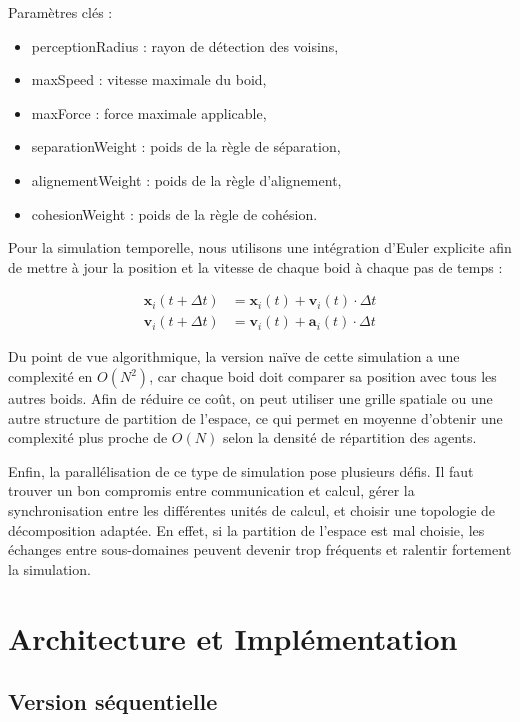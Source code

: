 \documentclass[conference]{IEEEtran}
\begin{document}
Paramètres clés :

\begin{itemize}
	\item perceptionRadius : rayon de détection des voisins,
	\item maxSpeed : vitesse maximale du boid,
	\item maxForce : force maximale applicable,
	\item separationWeight : poids de la règle de séparation,
	\item alignementWeight : poids de la règle d’alignement,
	\item cohesionWeight : poids de la règle de cohésion.
\end{itemize}

Pour la simulation temporelle, nous utilisons une intégration d’Euler explicite afin de mettre à jour la position et la vitesse de chaque boid à chaque pas de temps :

\begin{align}
	\mathbf{x}_i(t+\Delta t) & = \mathbf{x}_i(t) + \mathbf{v}_i(t)\cdot \Delta t \\
	\mathbf{v}_i(t+\Delta t) & = \mathbf{v}_i(t) + \mathbf{a}_i(t)\cdot \Delta t
\end{align}

Du point de vue algorithmique, la version naïve de cette simulation a une complexité en $O(N^2)$, car chaque boid doit comparer sa position avec tous les autres boids. Afin de réduire ce coût, on peut utiliser une grille spatiale ou une autre structure de partition de l’espace, ce qui permet en moyenne d’obtenir une complexité plus proche de $O(N)$ selon la densité de répartition des agents.

Enfin, la parallélisation de ce type de simulation pose plusieurs défis. Il faut trouver un bon compromis entre communication et calcul, gérer la synchronisation entre les différentes unités de calcul, et choisir une topologie de décomposition adaptée. En effet, si la partition de l’espace est mal choisie, les échanges entre sous-domaines peuvent devenir trop fréquents et ralentir fortement la simulation.

\section{Architecture et Implémentation}
\subsection{Version séquentielle}
\end{document}
